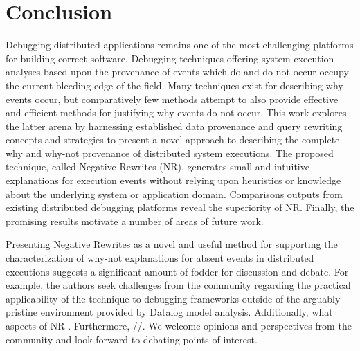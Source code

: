 \documentclass[letterpaper,twocolumn,10pt]{article}
\begin{document}
\section{Conclusion}
Debugging distributed applications remains one of the most challenging platforms for building correct software. Debugging techniques offering system execution analyses based upon the provenance of events which do and do not occur occupy the current bleeding-edge of the field. Many techniques exist for describing why events occur, but comparatively few methods attempt to also provide effective and efficient methods for justifying why events do not occur. This work explores the latter arena by harnessing established data provenance and query rewriting concepts and strategies to present a novel approach to describing the complete why and why-not provenance of distributed system executions. The proposed technique, called Negative Rewrites (NR), generates small and intuitive explanations for execution events without relying upon heuristics or knowledge about the underlying system or application domain. Comparisons outputs from existing distributed debugging platforms reveal the superiority of NR. Finally, the promising results motivate a number of areas of future work.

Presenting Negative Rewrites as a novel and useful method for supporting the characterization of why-not explanations for absent events in distributed executions suggests a significant amount of fodder for discussion and debate. For example, the authors seek challenges from the community regarding the practical applicability of the technique to debugging frameworks outside of the arguably pristine environment provided by Datalog model analysis. Additionally, what aspects of NR . Furthermore, //. We welcome opinions and perspectives from the community and look forward to debating points of interest.
\end{document}
